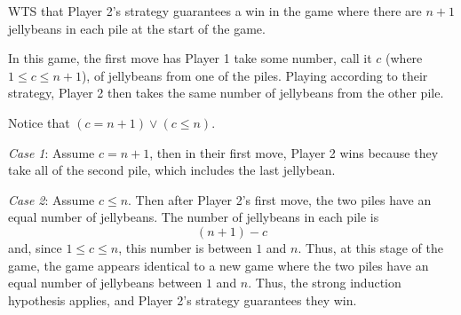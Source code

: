 WTS that Player 2's strategy guarantees a win in the game where
there are $n+1$ jellybeans in each pile at the start of the game.

In this game, the first move has Player 1 take 
some number, call it $c$ (where $1 \leq c \leq n+1$),
of jellybeans from one of the piles. 
Playing according to their strategy, Player 2 then 
takes the same number of jellybeans from  the other pile.

Notice that $(c = n+1) \lor (c \leq n)$.

{\it Case 1}: Assume $c = n+1$, then in their first move, 
Player 2 wins because they take all of the second pile, which 
includes the last jellybean.

{\it Case 2}: Assume $c \leq n$. Then after Player 2's first move,
the two piles have an equal number of jellybeans. The number
of jellybeans in each pile is 
\[
    (n+1) - c
\]
and, since $1 \leq c \leq n$, this number is between $1$ and $n$.
Thus, at this stage of the game, the game appears identical to a new 
game where the two piles have an equal number of jellybeans between $1$
and $n$. Thus, the strong induction hypothesis applies, and Player 2's
strategy guarantees they win.

